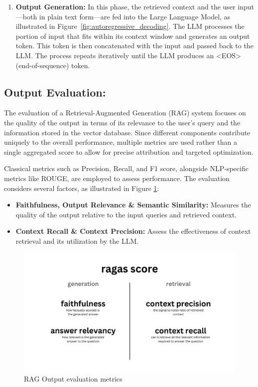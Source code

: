 \begin{enumerate}[label=\alph*.]
\item \textbf{Output Generation:}
In this phase, the retrieved context and the user input—both in plain text form—are fed into the Large Language Model, as illustrated in Figure~\ref{fig:autoregressive_decoding}. The LLM processes the portion of input that fits within its context window and generates an output token. This token is then concatenated with the input and passed back to the LLM. The process repeats iteratively until the LLM produces an <EOS> (end-of-sequence) token.


\end{enumerate}

\subsection{Output Evaluation:}
The evaluation of a Retrieval-Augmented Generation (RAG) system focuses on the quality of the output in terms of its relevance to the user's query and the information stored in the vector database. Since different components contribute uniquely to the overall performance, multiple metrics are used rather than a single aggregated score to allow for precise attribution and targeted optimization.

Classical metrics such as Precision, Recall, and F1 score, alongside NLP-specific metrics like ROUGE, are employed to assess performance. The evaluation considers several factors, as illustrated in Figure \ref{fig:RAGOutputevaluationmetrics}:
\begin{itemize}
    \item \textbf{Faithfulness, Output Relevance \& Semantic Similarity:} Measures the quality of the output relative to the input queries and retrieved context.
    \item \textbf{Context Recall \& Context Precision:} Assess the effectiveness of context retrieval and its utilization by the LLM.
\end{itemize}
\begin{figure}[H]
    \centering
    \includegraphics[width=0.56\linewidth]{images/rag-eval.png}
    \caption{RAG Output evaluation metrics ~\cite{cardenas2023rag}}
    \label{fig:RAGOutputevaluationmetrics}
\end{figure}

